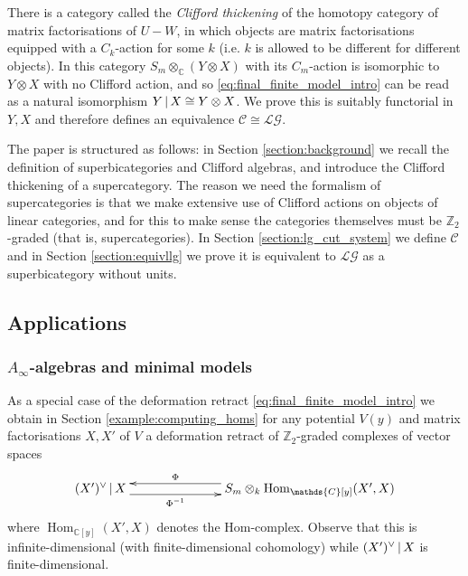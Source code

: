 \documentclass[english,letter paper,12pt,leqno]{article}
\theoremstyle{example}
\numberwithin{equation}{section}
\def\LG{\mathcal{LG}}
\def\Hom{\operatorname{Hom}}
\def\nZ{\mathds{Z}}
\def\nC{\mathds{C}}
\def\L{\mathcal{C}}
\begin{document}
There is a category called the \emph{Clifford thickening} of the homotopy category of matrix factorisations of $U - W$, in which objects are matrix factorisations equipped with a $C_k$-action for some $k$ (i.e. $k$ is allowed to be different for different objects). In this category $S_m \otimes_{\nC} ( Y \otimes X )$ with its $C_m$-action is isomorphic to $Y \otimes X$ with no Clifford action, and so \eqref{eq:final_finite_model_intro} can be read as a natural isomorphism $Y \,|\, X \cong Y \otimes X$. We prove this is suitably functorial in $Y,X$ and therefore defines an equivalence $\L \cong \LG$.

\vspace{0.5cm}

The paper is structured as follows: in Section \ref{section:background} we recall the definition of superbicategories and Clifford algebras, and introduce the Clifford thickening of a supercategory. The reason we need the formalism of supercategories is that we make extensive use of Clifford actions on objects of linear categories, and for this to make sense the categories themselves must be $\nZ_2$-graded (that is, supercategories). In Section \ref{section:lg_cut_system} we define $\L$ and in Section \ref{section:equivllg} we prove it is equivalent to $\LG$ as a superbicategory without units. 

\subsection{Applications}\label{section:intro_appli}

\subsubsection{$A_\infty$-algebras and minimal models}

As a special case of the deformation retract \eqref{eq:final_finite_model_intro} we obtain in Section \ref{example:computing_homs} for any potential $V(y)$ and matrix factorisations $X,X'$ of $V$ a deformation retract of $\nZ_2$-graded complexes of vector spaces
\begin{equation}\label{eq:final_finite_model_hom}
\xymatrix@C+4pc{
(X')^{\vee} \l X \ar@<-1ex>[r]_-{\Phi^{-1}} & S_m \otimes_k \Hom_{\nC[y]}(X', X) \ar@<-1ex>[l]_-{\Phi}
}
\end{equation}
where $\Hom_{\nC[y]}(X',X)$ denotes the Hom-complex. Observe that this is infinite-dimensional (with finite-dimensional cohomology) while $(X')^{\vee} \,|\, X$ is finite-dimensional.
\end{document}
